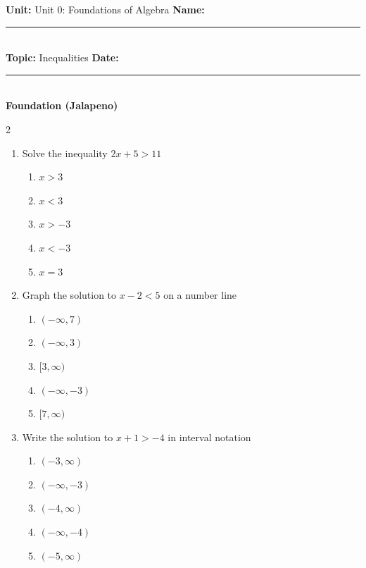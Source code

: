 \documentclass[10pt]{article}
\begin{document}
\enlargethispage{2.5cm}

\begin{tcolorbox}[colback=mainblue!5, colframe=mainblue, sharp corners, boxrule=0.5pt]
    \small \textbf{Unit:} Unit 0: Foundations of Algebra \hfill \textbf{Name:} \rule{3cm}{0.4pt} \\
    \small \textbf{Topic:} Inequalities \hfill \textbf{Date:} \rule{2cm}{0.4pt} \\
    \centering \textbf{\large Foundation (Jalapeno)}
\end{tcolorbox}

\vspace{0.2cm}

\begin{multicols}{2}
\begin{enumerate}[label=\textbf{Q\arabic*.}, leftmargin=*, itemsep=6pt, parsep=0pt]

  \item \small Solve the inequality $2x + 5 > 11$
  \begin{enumerate}[label=(\Alph*), leftmargin=0.6cm, nosep, itemsep=2pt]
    \item $x > 3$
    \item $x < 3$
    \item $x > -3$
    \item $x < -3$
    \item $x = 3$
  \end{enumerate}

  \item \small Graph the solution to $x - 2 < 5$ on a number line
  \begin{enumerate}[label=(\Alph*), leftmargin=0.6cm, nosep, itemsep=2pt]
    \item $(-\infty, 7)$
    \item $(-\infty, 3)$
    \item $[3, \infty)$
    \item $(-\infty, -3)$
    \item $[7, \infty)$
  \end{enumerate}

  \item \small Write the solution to $x + 1 > -4$ in interval notation
  \begin{enumerate}[label=(\Alph*), leftmargin=0.6cm, nosep, itemsep=2pt]
    \item $(-3, \infty)$
    \item $(-\infty, -3)$
    \item $(-4, \infty)$
    \item $(-\infty, -4)$
    \item $(-5, \infty)$
  \end{enumerate}


\end{enumerate}
\end{multicols}
\end{document}
